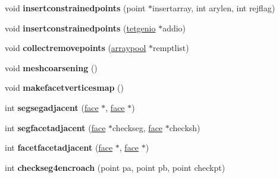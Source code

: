\begin{DoxyCompactItemize}
\item 
\hypertarget{classtetgenmesh_ac8205cae8e16f490b80d74975934ff74}{void {\bfseries insertconstrainedpoints} (point $\ast$insertarray, int arylen, int rejflag)}\label{classtetgenmesh_ac8205cae8e16f490b80d74975934ff74}

\item 
\hypertarget{classtetgenmesh_ab859365ca3dd3eafb77fac56d0ae3a03}{void {\bfseries insertconstrainedpoints} (\hyperlink{classtetgenio}{tetgenio} $\ast$addio)}\label{classtetgenmesh_ab859365ca3dd3eafb77fac56d0ae3a03}

\item 
\hypertarget{classtetgenmesh_add13a24cf325595ef693dca96f81470c}{void {\bfseries collectremovepoints} (\hyperlink{classtetgenmesh_1_1arraypool}{arraypool} $\ast$remptlist)}\label{classtetgenmesh_add13a24cf325595ef693dca96f81470c}

\item 
\hypertarget{classtetgenmesh_a85e17b620820cbcb6cb47b565f822062}{void {\bfseries meshcoarsening} ()}\label{classtetgenmesh_a85e17b620820cbcb6cb47b565f822062}

\item 
\hypertarget{classtetgenmesh_afa650c7021f3c73cf786d3f7fa687ed7}{void {\bfseries makefacetverticesmap} ()}\label{classtetgenmesh_afa650c7021f3c73cf786d3f7fa687ed7}

\item 
\hypertarget{classtetgenmesh_a15f22ccbe981fc0d0eb4342a3c75d515}{int {\bfseries segsegadjacent} (\hyperlink{classtetgenmesh_1_1face}{face} $\ast$, \hyperlink{classtetgenmesh_1_1face}{face} $\ast$)}\label{classtetgenmesh_a15f22ccbe981fc0d0eb4342a3c75d515}

\item 
\hypertarget{classtetgenmesh_adf193bbe36f5075b209f0d71fc74a18b}{int {\bfseries segfacetadjacent} (\hyperlink{classtetgenmesh_1_1face}{face} $\ast$checkseg, \hyperlink{classtetgenmesh_1_1face}{face} $\ast$checksh)}\label{classtetgenmesh_adf193bbe36f5075b209f0d71fc74a18b}

\item 
\hypertarget{classtetgenmesh_a60303418c35324c87dfa1fcb3b160708}{int {\bfseries facetfacetadjacent} (\hyperlink{classtetgenmesh_1_1face}{face} $\ast$, \hyperlink{classtetgenmesh_1_1face}{face} $\ast$)}\label{classtetgenmesh_a60303418c35324c87dfa1fcb3b160708}

\item 
\hypertarget{classtetgenmesh_ab30dcd2e1231eed4ff1a40d8b178db95}{int {\bfseries checkseg4encroach} (point pa, point pb, point checkpt)}\label{classtetgenmesh_ab30dcd2e1231eed4ff1a40d8b178db95}


\end{DoxyCompactItemize}

